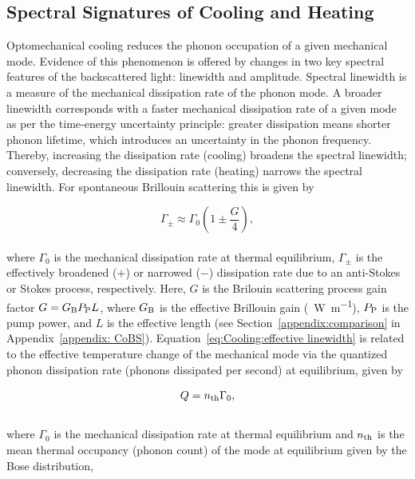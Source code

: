 \subsection{Spectral Signatures of Cooling and Heating}
\label{Cooling:subsec:SpectralSignaturesofCoolingandHeating}

Optomechanical cooling reduces the phonon occupation of a given mechanical mode. Evidence of this phenomenon is offered by changes in two key spectral features of the backscattered light: linewidth and amplitude. Spectral linewidth is a measure of the mechanical dissipation rate of the phonon mode. A broader linewidth corresponds with a faster mechanical dissipation rate of a given mode as per the time-energy uncertainty principle: greater dissipation means shorter phonon lifetime, which introduces an uncertainty in the phonon frequency. Thereby, increasing the dissipation rate (cooling) broadens the spectral linewidth; conversely, decreasing the dissipation rate (heating) narrows the spectral linewidth. For spontaneous Brillouin scattering this is given by \cite{otterstrom2018optomechanical}

\begin{equation}
  \Gamma_{\pm} \approx \Gamma_{0}\left(1 \pm \frac{G}{4}\right),
  \label{eq:Cooling:effective linewidth}
\end{equation}
\\
where \(\Gamma_{0}\) is the mechanical dissipation rate at thermal equilibrium, \(\Gamma_{\pm}\) is the effectively broadened (\(+\)) or narrowed (\(-\)) dissipation rate due to an anti-Stokes or Stokes process, respectively. Here, \(G\) is the Brilouin scattering process gain factor \(G = G_{\mathrm{B}}P_{\rm P}L\), where \(G_{\rm B}\) is the effective Brillouin gain (\si{\per\watt\per\meter}), \(P_{\rm P}\) is the pump power, and \(L\) is the effective length (see Section~\ref{appendix:comparison} in Appendix~\ref{appendix: CoBS}). Equation~\ref{eq:Cooling:effective linewidth} is related to the effective temperature change of the mechanical mode via the quantized phonon dissipation rate (phonons dissipated per second) at equilibrium, given by

\begin{equation}
  Q = n_{\rm th}\Gamma_{0},
  \label{eq:Cooling:Q}
\end{equation}
\\
where \(\Gamma_{0}\) is the mechanical dissipation rate at thermal equilibrium and \(n_{\rm th}\) is the mean thermal occupancy (phonon count) of the mode at equilibrium given by the Bose distribution,

